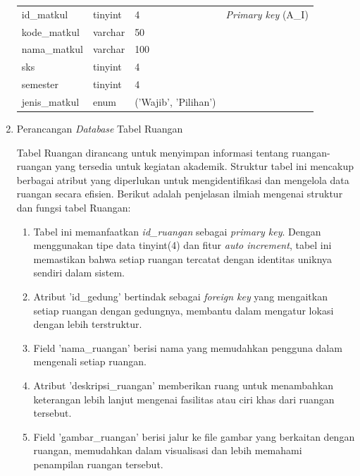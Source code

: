 \begin{enumerate}
{\begin{longtable}{l l l l}
				      id\_matkul              & tinyint                & 4                        & \textit{Primary key} (A\_I) \\
				      kode\_matkul            & varchar                & 50                       &                             \\
				      nama\_matkul            & varchar                & 100                      &                             \\
				      sks                     & tinyint                & 4                        &                             \\
				      semester                & tinyint                & 4                        &                             \\
				      jenis\_matkul           & enum                   & ('Wajib', 'Pilihan')     &                             \\
				      \hline
			      \end{longtable}
		      }

	\item Perancangan \textit{Database} Tabel Ruangan 

	      Tabel Ruangan dirancang untuk menyimpan informasi tentang ruangan-ruangan yang tersedia untuk kegiatan akademik. Struktur tabel ini mencakup berbagai atribut yang diperlukan untuk mengidentifikasi dan mengelola data ruangan secara efisien. Berikut adalah penjelasan ilmiah mengenai struktur dan fungsi tabel Ruangan:

				\begin{enumerate}[label=\alph*.]
		      \item Tabel ini memanfaatkan \textit{id\_ruangan} sebagai \textit{primary key}. Dengan menggunakan tipe data tinyint(4) dan fitur \textit{auto increment}, tabel ini memastikan bahwa setiap ruangan tercatat dengan identitas uniknya sendiri dalam sistem.
		      \item Atribut 'id\_gedung' bertindak sebagai \textit{foreign key} yang mengaitkan setiap ruangan dengan gedungnya, membantu dalam mengatur lokasi dengan lebih terstruktur.
		      \item Field 'nama\_ruangan' berisi nama yang memudahkan pengguna dalam mengenali setiap ruangan.
		      \item Atribut 'deskripsi\_ruangan' memberikan ruang untuk menambahkan keterangan lebih lanjut mengenai fasilitas atau ciri khas dari ruangan tersebut.
		      \item Field 'gambar\_ruangan' berisi jalur ke file gambar yang berkaitan dengan ruangan, memudahkan dalam visualisasi dan lebih memahami penampilan ruangan tersebut.
	      \end{enumerate}


\end{enumerate}
